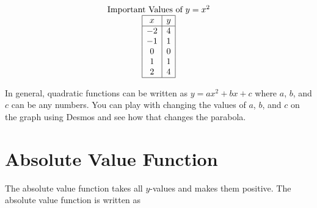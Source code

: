 \documentclass[nooutcomes]{ximera}
\begin{document}
\begin{center}
\end{center}

\begin{center}
\end{center}

\[
\begin{array}{c }
\text{Important Values of $y=x^2$}\\
\begin{array}{|c|c|}
 \hline
 x & y\\
 \hline
 -2&4\\
 -1&1\\
 0&0\\
 1&1\\
 2&4\\
 \hline
\end{array}
\end{array}
\]

In general, quadratic functions can be written as $y=ax^2+bx+c$ where $a$, $b$, and $c$ can be any numbers.  You can play with changing the values of $a$, $b$, and $c$ on the graph using Desmos and see how that changes the parabola.  

\begin{center}  
\end{center}


\newpage


\section{Absolute Value Function}
The absolute value function takes all $y$-values and makes them positive.  The absolute value function is written as 

\begin{center}
\end{center}
\end{document}
